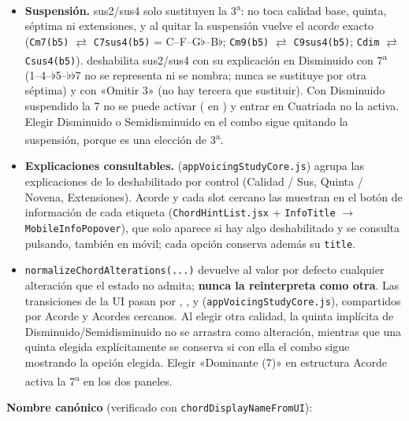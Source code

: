 \documentclass[a4paper,11pt,oneside]{report}
\newcommand{\flt}{\ensuremath{\flat}}
\begin{document}
\begin{itemize}
\item \textbf{Suspensión.} sus2/sus4 solo sustituyen la 3\textsuperscript{a}: \texttt{} no toca calidad base, quinta, séptima ni extensiones, y al quitar la suspensión vuelve el acorde exacto (\lstinline!Cm7(b5)! $\rightleftarrows$ \lstinline!C7sus4(b5)! = C--F--G\flt--B\flt; \lstinline!Cm9(b5)! $\rightleftarrows$ \lstinline!C9sus4(b5)!; \lstinline!Cdim! $\rightleftarrows$ \lstinline!Csus4(b5)!). \texttt{} deshabilita sus2/sus4 con su explicación en Disminuido con 7\textsuperscript{a} (1--4--\flt5--\flt\flt7 no se representa ni se nombra; nunca se sustituye por otra séptima) y con «Omitir 3» (no hay tercera que sustituir). Con Disminuido suspendido la 7 no se puede activar (\texttt{} en \texttt{}) y entrar en Cuatriada no la activa. Elegir Disminuido o Semidisminuido en el combo sigue quitando la suspensión, porque es una elección de 3\textsuperscript{a}.
\item \textbf{Explicaciones consultables.} \texttt{} (\lstinline!appVoicingStudyCore.js!) agrupa las explicaciones de lo deshabilitado por control (Calidad / Sus, Quinta / Novena, Extensiones). Acorde y cada slot cercano las muestran en el botón de información de cada etiqueta (\lstinline!ChordHintList.jsx! + \lstinline!InfoTitle! $\to$ \lstinline!MobileInfoPopover!), que solo aparece si hay algo deshabilitado y se consulta pulsando, también en móvil; cada opción conserva además su \lstinline!title!.
\item \lstinline!normalizeChordAlterations(...)! devuelve al valor por defecto cualquier alteración que el estado no admita; \textbf{nunca la reinterpreta como otra}. Las transiciones de la UI pasan por \texttt{}, \texttt{}, \texttt{} y \texttt{} (\lstinline!appVoicingStudyCore.js!), compartidos por Acorde y Acordes cercanos. Al elegir otra calidad, la quinta implícita de Disminuido/Semidisminuido no se arrastra como alteración, mientras que una quinta elegida explícitamente se conserva si con ella el combo sigue mostrando la opción elegida. Elegir «Dominante (7)» en estructura Acorde activa la 7\textsuperscript{a} en los dos paneles.
\end{itemize}

\textbf{Nombre canónico} (verificado con \lstinline!chordDisplayNameFromUI!):
\end{document}
